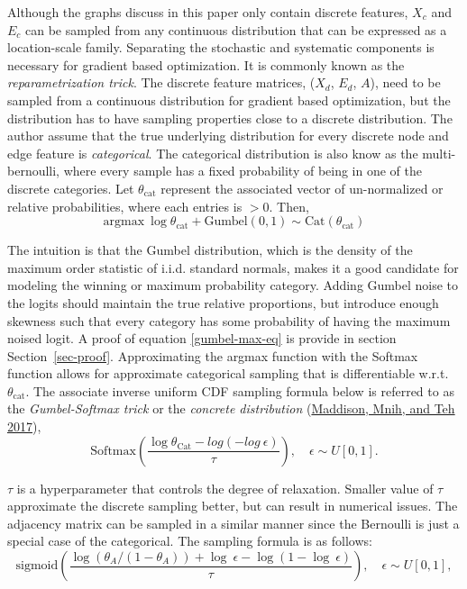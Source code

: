 \documentclass[
  11pt,
  letterpaper,
]{article}
\begin{document}
\quad Although the graphs discuss in this paper only contain discrete
features, \(X_c\) and \(E_c\) can be sampled from any continuous
distribution that can be expressed as a location-scale family.
Separating the stochastic and systematic components is necessary for
gradient based optimization. It is commonly known as the
\emph{reparametrization trick}. The discrete feature matrices, (\(X_d\),
\(E_d\), \(A\)), need to be sampled from a continuous distribution for
gradient based optimization, but the distribution has to have sampling
properties close to a discrete distribution. The author assume that the
true underlying distribution for every discrete node and edge feature is
\emph{categorical}. The categorical distribution is also know as the
multi-bernoulli, where every sample has a fixed probability of being in
one of the discrete categories. Let \(\theta_\text{cat}\) represent the
associated vector of un-normalized or relative probabilities, where each
entries is \(>0\). Then, \begin{equation} \label{gumbel-max-eq}
    \text{argmax} \ \log \theta_\text{cat} + \text{Gumbel}(0, 1)
        \sim \text{Cat}(\theta_\text{cat})
\end{equation}

The intuition is that the Gumbel distribution, which is the density of
the maximum order statistic of i.i.d. standard normals, makes it a good
candidate for modeling the winning or maximum probability category.
Adding Gumbel noise to the logits should maintain the true relative
proportions, but introduce enough skewness such that every category has
some probability of having the maximum noised logit. A proof of equation
\ref{gumbel-max-eq} is provide in section Section~\ref{sec-proof}.
Approximating the argmax function with the Softmax function allows for
approximate categorical sampling that is differentiable w.r.t.
\(\theta_\text{cat}\). The associate inverse uniform CDF sampling
formula below is referred to as the \emph{Gumbel-Softmax trick} or the
\emph{concrete distribution}
(\protect\hyperlink{ref-Maddison_Mnih_Teh_2017}{Maddison, Mnih, and Teh
2017}),\\
\begin{equation}
    \text{Softmax}
    \left(
        \dfrac{\log \theta_{\text{Cat}} - log(-log \ \epsilon)}{\tau}
    \right), \quad \epsilon \sim U[0, 1].
\end{equation}

\(\tau\) is a hyperparameter that controls the degree of relaxation.
Smaller value of \(\tau\) approximate the discrete sampling better, but
can result in numerical issues. The adjacency matrix can be sampled in a
similar manner since the Bernoulli is just a special case of the
categorical. The sampling formula is as follows:\\
\begin{equation} \label{binary-concrete}
        \text{sigmoid}
            \left(\dfrac{\log(\theta_A / (1 - \theta_A)) + \log \ \epsilon - \log(1 - \log \ \epsilon)}{\tau} \right), \quad \epsilon \sim U[0, 1], 
    \end{equation}
\end{document}

